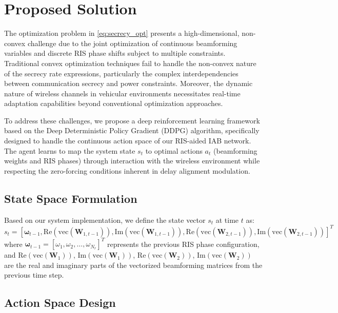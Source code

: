 \section{Proposed Solution}\label{Sec:ProposedSolution}

The optimization problem in \eqref{eq:secrecy_opt} presents a high-dimensional, non-convex challenge due to the joint optimization of continuous beamforming variables and discrete RIS phase shifts subject to multiple constraints. Traditional convex optimization techniques fail to handle the non-convex nature of the secrecy rate expressions, particularly the complex interdependencies between communication secrecy and power constraints. Moreover, the dynamic nature of wireless channels in vehicular environments necessitates real-time adaptation capabilities beyond conventional optimization approaches.

To address these challenges, we propose a deep reinforcement learning framework based on the Deep Deterministic Policy Gradient (DDPG) algorithm, specifically designed to handle the continuous action space of our RIS-aided IAB network. The agent learns to map the system state $s_t$ to optimal actions $a_t$ (beamforming weights and RIS phases) through interaction with the wireless environment while respecting the zero-forcing conditions inherent in delay alignment modulation.

\subsection{State Space Formulation}

Based on our system implementation, we define the state vector $s_t$ at time $t$ as:
\begin{equation}
s_t = [\boldsymbol{\omega}_{t-1}, \text{Re}(\text{vec}(\mathbf{W}_{1,t-1})), \text{Im}(\text{vec}(\mathbf{W}_{1,t-1})), \text{Re}(\text{vec}(\mathbf{W}_{2,t-1})), \text{Im}(\text{vec}(\mathbf{W}_{2,t-1}))]^T
\end{equation}
where $\boldsymbol{\omega}_{t-1} = [\omega_1, \omega_2, \ldots, \omega_{N_r}]^T$ represents the previous RIS phase configuration, and $\text{Re}(\text{vec}(\mathbf{W}_{1}))$, $\text{Im}(\text{vec}(\mathbf{W}_{1}))$, $\text{Re}(\text{vec}(\mathbf{W}_{2}))$, $\text{Im}(\text{vec}(\mathbf{W}_{2}))$ are the real and imaginary parts of the vectorized beamforming matrices from the previous time step.

\subsection{Action Space Design}

